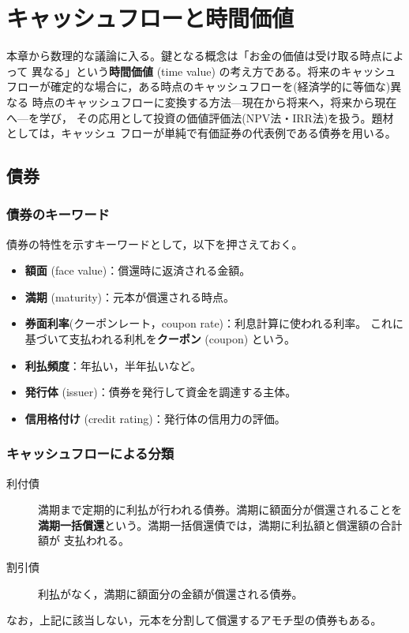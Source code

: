 \chapter{キャッシュフローと時間価値}

本章から数理的な議論に入る。鍵となる概念は「お金の価値は受け取る時点によって
異なる」という\textbf{時間価値} (time value) の考え方である。将来のキャッシュ
フローが確定的な場合に，ある時点のキャッシュフローを(経済学的に等価な)異なる
時点のキャッシュフローに変換する方法---現在から将来へ，将来から現在へ---を学び，
その応用として投資の価値評価法(NPV法・IRR法)を扱う。題材としては，キャッシュ
フローが単純で有価証券の代表例である債券を用いる。

\section{債券}

\subsection{債券のキーワード}

債券の特性を示すキーワードとして，以下を押さえておく。

\begin{itemize}
\item \textbf{額面} (face value)：償還時に返済される金額。
\item \textbf{満期} (maturity)：元本が償還される時点。
\item \textbf{券面利率}(クーポンレート，coupon rate)：利息計算に使われる利率。
これに基づいて支払われる利札を\textbf{クーポン} (coupon) という。
\item \textbf{利払頻度}：年払い，半年払いなど。
\item \textbf{発行体} (issuer)：債券を発行して資金を調達する主体。
\item \textbf{信用格付け} (credit rating)：発行体の信用力の評価。
\end{itemize}

\subsection{キャッシュフローによる分類}

\begin{description}
\item[利付債] 満期まで定期的に利払が行われる債券。満期に額面分が償還されることを
\textbf{満期一括償還}という。満期一括償還債では，満期に利払額と償還額の合計額が
支払われる。
\item[割引債] 利払がなく，満期に額面分の金額が償還される債券。
\end{description}
なお，上記に該当しない，元本を分割して償還するアモチ型の債券もある。

